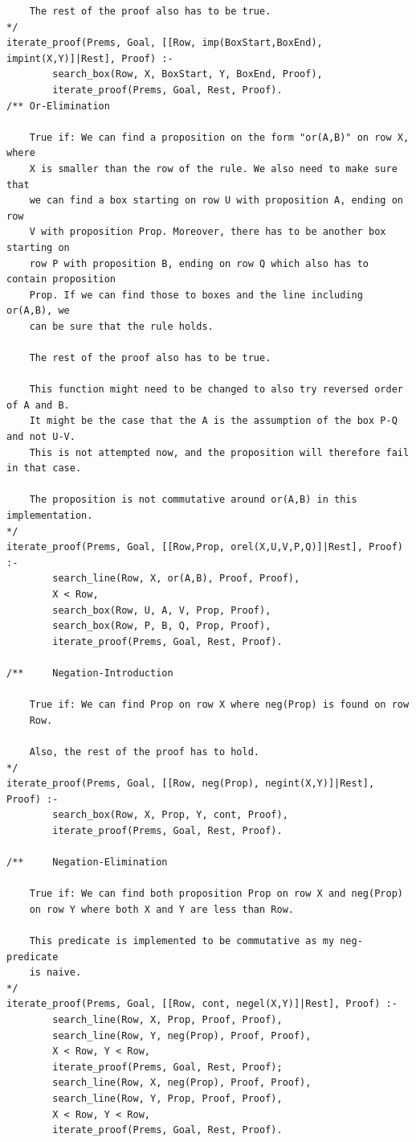 \documentclass[a4paper]{article}
\begin{document}
\begin{verbatim}
	The rest of the proof also has to be true.
*/
iterate_proof(Prems, Goal, [[Row, imp(BoxStart,BoxEnd), impint(X,Y)]|Rest], Proof) :-
        search_box(Row, X, BoxStart, Y, BoxEnd, Proof),
        iterate_proof(Prems, Goal, Rest, Proof).
/**	Or-Elimination
	
	True if: We can find a proposition on the form "or(A,B)" on row X, where
	X is smaller than the row of the rule. We also need to make sure that
	we can find a box starting on row U with proposition A, ending on row
	V with proposition Prop. Moreover, there has to be another box starting on
	row P with proposition B, ending on row Q which also has to contain proposition
	Prop. If we can find those to boxes and the line including or(A,B), we
	can be sure that the rule holds.
	
	The rest of the proof also has to be true.
	
	This function might need to be changed to also try reversed order of A and B.
	It might be the case that the A is the assumption of the box P-Q and not U-V.
	This is not attempted now, and the proposition will therefore fail in that case.
	
	The proposition is not commutative around or(A,B) in this implementation.
*/
iterate_proof(Prems, Goal, [[Row,Prop, orel(X,U,V,P,Q)]|Rest], Proof) :-
        search_line(Row, X, or(A,B), Proof, Proof),
        X < Row,
        search_box(Row, U, A, V, Prop, Proof),
        search_box(Row, P, B, Q, Prop, Proof),
        iterate_proof(Prems, Goal, Rest, Proof).

/**     Negation-Introduction

	True if: We can find Prop on row X where neg(Prop) is found on row
	Row.
	
	Also, the rest of the proof has to hold.
*/
iterate_proof(Prems, Goal, [[Row, neg(Prop), negint(X,Y)]|Rest], Proof) :-
        search_box(Row, X, Prop, Y, cont, Proof),
        iterate_proof(Prems, Goal, Rest, Proof).

/**     Negation-Elimination

	True if: We can find both proposition Prop on row X and neg(Prop)
	on row Y where both X and Y are less than Row.
	
	This predicate is implemented to be commutative as my neg-predicate
	is naive.
*/
iterate_proof(Prems, Goal, [[Row, cont, negel(X,Y)]|Rest], Proof) :-
        search_line(Row, X, Prop, Proof, Proof),
        search_line(Row, Y, neg(Prop), Proof, Proof),
        X < Row, Y < Row,
        iterate_proof(Prems, Goal, Rest, Proof);
        search_line(Row, X, neg(Prop), Proof, Proof),
        search_line(Row, Y, Prop, Proof, Proof),
        X < Row, Y < Row,
        iterate_proof(Prems, Goal, Rest, Proof).


\end{verbatim}
\end{document}
